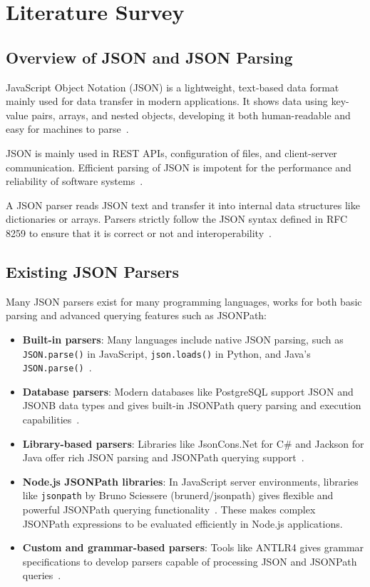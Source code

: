 \chapter{Literature Survey}

\section{Overview of JSON and JSON Parsing}

JavaScript Object Notation (JSON) is a lightweight, text-based data format mainly used for data transfer in modern applications. It shows data using key-value pairs, arrays, and nested objects, developing it both human-readable and easy for machines to parse~\cite{ietf_rfc9535}.

JSON is mainly used in REST APIs, configuration of files, and client-server communication. Efficient parsing of JSON is impotent for the performance and reliability of software systems~\cite{sql_json_wiscorp}.

A JSON parser reads JSON text and transfer it into internal data structures like dictionaries or arrays. Parsers strictly follow the JSON syntax defined in RFC 8259 to ensure that it is correct or not and interoperability~\cite{ietf_rfc9535}.

\section{Existing JSON Parsers}

Many JSON parsers exist for many programming languages, works for both basic parsing and advanced querying features such as JSONPath:

\begin{itemize}
	\item \textbf{Built-in parsers}: Many languages include native JSON parsing, such as \texttt{JSON.parse()} in JavaScript, \texttt{json.loads()} in Python, and Java’s \texttt{JSON.parse()}~\cite{programmerall_article}.
	\item \textbf{Database parsers}: Modern databases like PostgreSQL support JSON and JSONB data types and gives built-in JSONPath query parsing and execution capabilities~\cite{postgres_jsonpath}.
	\item \textbf{Library-based parsers}: Libraries like JsonCons.Net for C\# and Jackson for Java offer rich JSON parsing and JSONPath querying support~\cite{jsoncons_net}.
	\item \textbf{Node.js JSONPath libraries}: In JavaScript server environments, libraries like \texttt{jsonpath} by Bruno Sciessere (brunerd/jsonpath) gives flexible and powerful JSONPath querying functionality~\cite{brunerd_jsonpath}. These makes complex JSONPath expressions to be evaluated efficiently in Node.js applications.
	\item \textbf{Custom and grammar-based parsers}: Tools like ANTLR4 gives grammar specifications to develop parsers capable of processing JSON and JSONPath queries~\cite{antlr4_jsonpath}.
\end{itemize}

